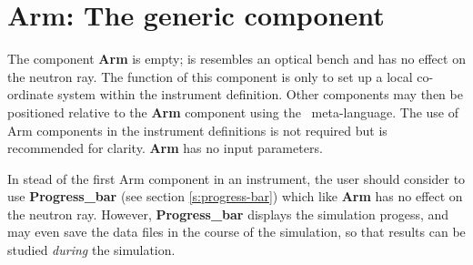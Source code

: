 \section{Arm: The generic component}
\label{explain:arm}

The component {\bf Arm} is empty; is resembles an optical bench
and has no effect on the neutron ray.
The function of this component is only to set up a local
co-ordinate system within the instrument definition.
Other components may then be
positioned relative to the {\bf Arm} component
using the \MCS\ meta-language.
The use of {\rm Arm} components in the instrument definitions
is not required but is recommended for clarity.
{\bf Arm} has no input parameters.

In stead of the first {\rm Arm} component in an instrument,
the user should consider to use {\bf Progress\_bar} 
(see section \ref{s:progress-bar}) which like {\bf Arm} has no effect
on the neutron ray. 
However, {\bf Progress\_bar} displays the simulation progess, 
and may even save the data files in the course of the simulation, 
so that results can be studied \emph{during} the simulation.

